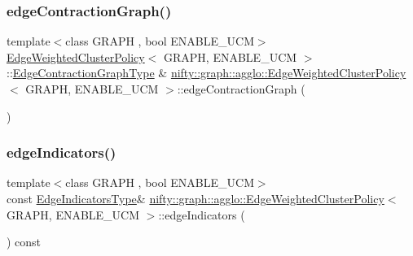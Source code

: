 \subsubsection{\texorpdfstring{edge\+Contraction\+Graph()}{edgeContractionGraph()}}
{\footnotesize\ttfamily template$<$class G\+R\+A\+PH , bool E\+N\+A\+B\+L\+E\+\_\+\+U\+CM$>$ \\
\hyperlink{classnifty_1_1graph_1_1agglo_1_1EdgeWeightedClusterPolicy}{Edge\+Weighted\+Cluster\+Policy}$<$ G\+R\+A\+PH, E\+N\+A\+B\+L\+E\+\_\+\+U\+CM $>$\+::\hyperlink{classnifty_1_1graph_1_1agglo_1_1EdgeWeightedClusterPolicy_af2c3024ed1be514c58004dfa7e77448b}{Edge\+Contraction\+Graph\+Type} \& \hyperlink{classnifty_1_1graph_1_1agglo_1_1EdgeWeightedClusterPolicy}{nifty\+::graph\+::agglo\+::\+Edge\+Weighted\+Cluster\+Policy}$<$ G\+R\+A\+PH, E\+N\+A\+B\+L\+E\+\_\+\+U\+CM $>$\+::edge\+Contraction\+Graph (\begin{DoxyParamCaption}{ }\end{DoxyParamCaption})\hspace{0.3cm}{\ttfamily [inline]}}

\mbox{\label{classnifty_1_1graph_1_1agglo_1_1EdgeWeightedClusterPolicy_afe6e558bb6a29f89a97d59b7b2d10330}} 
\subsubsection{\texorpdfstring{edge\+Indicators()}{edgeIndicators()}}
{\footnotesize\ttfamily template$<$class G\+R\+A\+PH , bool E\+N\+A\+B\+L\+E\+\_\+\+U\+CM$>$ \\
const \hyperlink{classnifty_1_1graph_1_1agglo_1_1EdgeWeightedClusterPolicy_a1b8107133a86be855885f1910652b0af}{Edge\+Indicators\+Type}\& \hyperlink{classnifty_1_1graph_1_1agglo_1_1EdgeWeightedClusterPolicy}{nifty\+::graph\+::agglo\+::\+Edge\+Weighted\+Cluster\+Policy}$<$ G\+R\+A\+PH, E\+N\+A\+B\+L\+E\+\_\+\+U\+CM $>$\+::edge\+Indicators (\begin{DoxyParamCaption}{ }\end{DoxyParamCaption}) const\hspace{0.3cm}{\ttfamily [inline]}}

